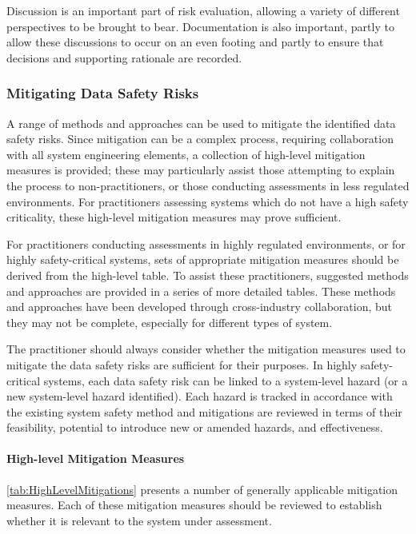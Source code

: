 Discussion is an important part of risk evaluation, allowing a variety of different perspectives to be brought to bear. Documentation is also important, partly to allow these discussions to occur on an even footing and partly to ensure that decisions and supporting rationale are recorded.

\subsubsection{Mitigating Data Safety Risks}
A range of methods and approaches can be used to mitigate the identified data safety risks. Since mitigation can be a complex process, requiring collaboration with all system engineering elements, a collection of high-level mitigation measures is provided; these may particularly assist those attempting to explain the process to non-practitioners, or those conducting assessments in less regulated environments. For practitioners assessing systems which do not have a high safety criticality, these high-level mitigation measures may prove sufficient.

For practitioners conducting assessments in highly regulated environments, or for highly safety-critical systems, sets of appropriate mitigation measures should be derived from the high-level table. To assist these practitioners, suggested methods and approaches are provided in a series of more detailed tables. These methods and approaches have been developed through cross-industry collaboration, but they may not be complete, especially for different types of system. 

The practitioner should always consider whether the mitigation measures used to mitigate the data safety risks are sufficient for their purposes. In highly safety-critical systems, each data safety risk can be linked to a system-level hazard (or a new system-level hazard identified). Each hazard is tracked in accordance with the existing system safety method and mitigations are reviewed in terms of their feasibility, potential to introduce new or amended hazards, and effectiveness.

\paragraph{High-level Mitigation Measures}
\autoref{tab:HighLevelMitigations} presents a number of generally applicable mitigation measures.
Each of these mitigation measures should be reviewed to establish whether it is relevant to the system under assessment.

